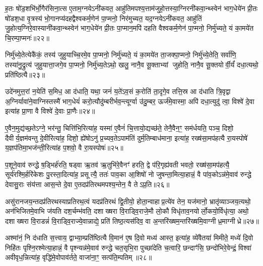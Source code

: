 ह॒तः षो॑ड॒शभि॑र्भो॒गैर॑सिना॒त्स ए॒ताम॒ग्नयेऽनी॑कवत॒ आहु॑तिमपश्य॒त्ताम॑जुहो॒त्तस्या॒ग्निरनी॑कवा॒न्थ्स्वेन॑ भाग॒धेये॑न प्री॒तः षो॑डश॒धा वृ॒त्रस्य॑ भो॒गानप्य॑दहद्वैश्वकर्म॒णेन॑ पा॒प्मनो॒ निर॑मुच्यत॒ यद॒ग्नयेऽनी॑कवत॒ आहु॑तिं जु॒होत्य॒ग्निरे॒वास्यानी॑कवा॒न्थ्स्वेन॑ भाग॒धेये॑न प्री॒तः पा॒प्मान॒मपि॑ दहति वैश्वकर्म॒णेन॑ पा॒प्मनो॒ निर्मु॑च्यते॒ यं का॒मये॑त चि॒रम्पा॒प्मनः॑॥२२॥

निर्मु॑च्ये॒तेत्येकै॑कं॒ तस्य॑ जुहुयाच्चि॒रमे॒व पा॒प्मनो॒ निर्मु॑च्यते॒ यं का॒मये॑त ता॒जक्पा॒प्मनो॒ निर्मु॑च्ये॒तेति॒ सर्वा॑णि॒ तस्या॑नु॒द्रुत्य॑ जुहुयात्ता॒जगे॒व पा॒प्मनो॒ निर्मु॑च्य॒तेऽथो॒ खलु॒ नानै॒व सू॒क्ताभ्यां जुहोति॒ नानै॒व सू॒क्तयोर्वी॒र्यं॑ दधा॒त्यथो॒ प्रति॑ष्ठित्यै॥२३॥

{\anuvakamend[{दे॒वाः प्रा॑जाप॒त्यो वृ॒त्रश्चि॒रं पा॒प्मन॑श्चत्वारि॒ꣳ॒शच्च॑॥५॥}]}

उदे॑नमुत्त॒रां न॒येति॑ स॒मिध॒ आ द॑धाति॒ यथा॒ जनं॑ य॒ते॑ऽव॒सं क॒रोति॑ ता॒दृगे॒व तत्ति॒स्र आ द॑धाति त्रि॒वृद्वा अ॒ग्निर्यावा॑ने॒वाग्निस्तस्मै॑ भाग॒धेयं॑ करो॒त्यौदु॑म्बरीर्भव॒न्त्यूर्ग्वा उ॑दु॒म्बर॒ ऊर्ज॑मे॒वास्मा॒ अपि॑ दधा॒त्युदु॑ त्वा॒ विश्वे॑ दे॒वा इत्या॑ह प्रा॒णा वै विश्वे॑ दे॒वाः प्रा॒णैः॥२४॥

ए॒वैन॒मुद्य॑च्छ॒तेऽग्ने॒ भर॑न्तु॒ चित्ति॑भि॒रित्या॑ह॒ यस्मा॑ ए॒वैनं॑ चि॒त्तायो॒द्यच्छ॑ते॒ तेनै॒वैन॒ꣳ॒ सम॑र्धयति॒ पञ्च॒ दिशो॒ दैवीर्य॒ज्ञम॑वन्तु दे॒वीरित्या॑ह॒ दिशो॒ ह्ये॑षोऽनु॑ प्र॒च्यव॒तेऽपाम॑तिं दुर्म॒तिम्बाध॑माना॒ इत्या॑ह॒ रख्ष॑सा॒मप॑हत्यै रा॒यस्पोषे॑ य॒ज्ञप॑तिमा॒भज॑न्ती॒रित्या॑ह प॒शवो॒ वै रा॒यस्पोषः॑॥२५॥

प॒शूने॒वाव॑ रुन्द्धे ष॒ड्भिर्\mbox{}ह॑रति॒ षड्वा ऋ॒तव॑ ऋ॒तुभि॑रे॒वैनꣳ॑ हरति॒ द्वे प॑रि॒गृह्य॑वती भवतो॒ रख्ष॑सा॒मप॑हत्यै॒ सूर्य॑रश्मि॒र्\mbox{}हरि॑केशः पु॒रस्ता॒दित्या॑ह॒ प्रसूत्यै॒ ततः॑ पाव॒का आ॒शिषो॑ नो जुषन्ता॒मित्या॒हान्नं॒ वै पा॑व॒कोऽन्न॑मे॒वाव॑ रुन्द्धे देवासु॒राः संय॑त्ता आस॒न्ते दे॒वा ए॒तदप्र॑तिरथमपश्य॒न्तेन॒ वै तेऽप्र॒ति॥२६॥

असु॑रानजय॒न्तदप्र॑तिरथस्याप्रतिरथ॒त्वं यदप्र॑तिरथं द्वि॒तीयो॒ होता॒न्वाहाप्र॒त्ये॑व तेन॒ यज॑मानो॒ भ्रातृ॑व्याञ्जय॒त्यथो॒ अन॑भिजितमे॒वाभि ज॑यति दश॒र्चम्भ॑वति॒ दशाख्षरा वि॒राड्वि॒राजे॒मौ लो॒कौ विधृ॑ताव॒नयोर्लो॒कयो॒र्विधृ॑त्या॒ अथो॒ दशाख्षरा वि॒राडन्नं॑ वि॒राड्वि॒राज्ये॒वान्नाद्ये॒ प्रति॑ तिष्ठ॒त्यस॑दिव॒ वा अ॒न्तरि॑ख्षम॒न्तरि॑ख्षमि॒वाग्नीध्र॒माग्नीध्रे॥२७॥

अश्मा॑नं॒ नि द॑धाति स॒त्त्वाय॒ द्वाभ्या॒म्प्रति॑ष्ठित्यै वि॒मान॑ ए॒ष दि॒वो मध्य॑ आस्त॒ इत्या॑ह॒ व्ये॑वैतया॑ मिमीते॒ मध्ये॑ दि॒वो निहि॑तः पृश्नि॒रश्मेत्या॒हान्नं॒ वै पृश्न्यन्न॑मे॒वाव॑ रुन्द्धे चत॒सृभि॒रा पुच्छा॑देति च॒त्वारि॒ छन्दाꣳ॑सि॒ छन्दो॑भिरे॒वेन्द्रं॒ विश्वा॑ अवीवृध॒न्नित्या॑ह॒ वृद्धि॑मे॒वोपाव॑र्तते॒ वाजा॑ना॒ꣳ॒ सत्प॑ति॒म्पतिम्॥२८॥

